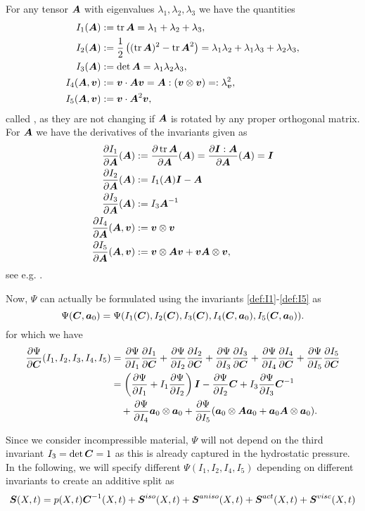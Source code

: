 For any tensor $\vA$ with eigenvalues $\lambda_1,\lambda_2,\lambda_3$ we have the quantities
\begin{align}
	I_1(\vA) &:= \tr\vA = \lambda_1 + \lambda_2 + \lambda_3,\label{def:I1}\\
	I_2(\vA) &:= \frac{1}{2}\left((\tr \vA)^2 - \tr\vA^2\right) = \lambda_1\lambda_2 + \lambda_1\lambda_3 + \lambda_2\lambda_3,\\
	I_3(\vA) &:= \det\vA = \lambda_1\lambda_2\lambda_3,\label{def:I3}\\
	I_4(\vA,\vv) &:= \vv\cdot\vA\vv = \vA : (\vv \otimes \vv)\label{def:I4} =: \lambda^2_{\vv},\\
	I_5(\vA,\vv) &:= \vv\cdot\vA^2\vv,\label{def:I5}
\end{align}
called , as they are not changing if $\vA$ is rotated by any proper orthogonal matrix.
For  $\vA$ we have the derivatives of the invariants given as
\begin{align}
	\d{I_1}{\vA}(\vA) &:= \d{\tr\vA}{\vA}(\vA) = \d{\vI:\vA}{\vA}(\vA) = \vI\\
	\d{I_2}{\vA}(\vA) &:= I_1(\vA)\vI - \vA\\
	\d{I_3}{\vA}(\vA) &:= I_3\vA^{-1}\\
	\d{I_4}{\vA}(\vA,\vv) &:= \vv \otimes \vv\label{def:dI4}\\
	\d{I_5}{\vA}(\vA,\vv) &:= \vv \otimes \vA\vv + \vv\vA \otimes \vv,
\end{align}
see e.g. \cite[p.216/p.268]{Holzapfel2000}.

Now, $\Psi$ can actually be formulated using the invariants \eqref{def:I1}-\eqref{def:I5} as
\[
	\Psi(\vC,\va_0) = \Psi(I_1(\vC),I_2(\vC),I_3(\vC),I_4(\vC,\va_0),I_5(\vC,\va_0)).
\]
for which we have
\begin{align}
	\d{\Psi}{\vC}(I_1,I_2,I_3,I_4,I_5) &=
		\d{\Psi}{I_1}\d{I_1}{\vC} + \d{\Psi}{I_2}\d{I_2}{\vC} + \d{\Psi}{I_3}\d{I_3}{\vC} + \d{\Psi}{I_4}\d{I_4}{\vC} + \d{\Psi}{I_5}\d{I_5}{\vC}\\
		&= \left(\d{\Psi}{I_1} + I_1\d{\Psi}{I_2}\right)\vI - \d{\Psi}{I_2}\vC + I_3\d{\Psi}{I_3}\vC^{-1}\\
		&\quad+ \d{\Psi}{I_4}\va_0\otimes\va_0 + \d{\Psi}{I_5}(\va_0\otimes\vA\va_0 + \va_0\vA\otimes\va_0).
\end{align}

Since we consider incompressible material, $\Psi$ will not depend on the third invariant $I_3 = \det\vC = 1$ as this is already captured in the hydrostatic pressure. 
In the following, we will specify different $\Psi(I_1,I_2,I_4,I_5)$ depending on different invariants to create an additive split as 
\begin{align}
	\vS(X,t) = p(X,t)\vC^{-1}(X,t) + \vSi(X,t) + \vSa(X,t) + \vSf(X,t) +\vSv(X,t) \label{def:S_split}
\end{align}


